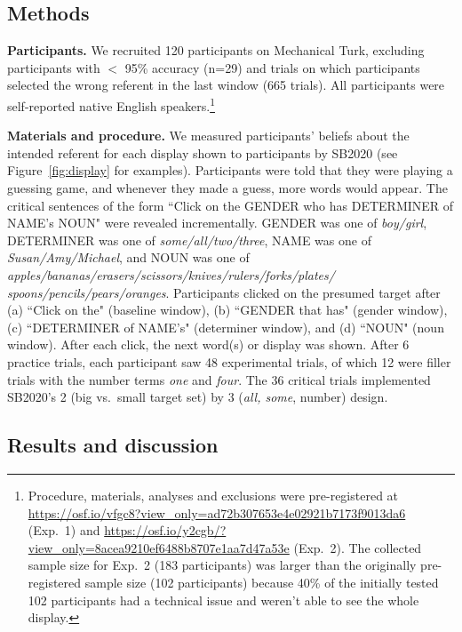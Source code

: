\documentclass[10pt,letterpaper]{article}
\newcommand{\figref}[1]{Figure~\ref{#1}}
\begin{document}
\subsection{Methods}

\textbf{Participants.} We recruited 120 participants on Mechanical Turk, excluding participants with $<$ 95\% accuracy (n=29) and trials on which participants selected the wrong referent in the last window (665 trials). All participants were self-reported native English speakers.\footnote{Procedure, materials, analyses and exclusions were pre-registered at \href{https://osf.io/vfgc8?view_only=ad72b307653e4e02921b7173f9013da6}{\url{https://osf.io/vfgc8?view_only=ad72b307653e4e02921b7173f9013da6}} (Exp.~1) and \href{https://osf.io/y2cgb/?view_only=8acea9210ef6488b8707e1aa7d47a53e}{\url{https://osf.io/y2cgb/?view_only=8acea9210ef6488b8707e1aa7d47a53e}} (Exp.~2). The collected sample size for Exp.~2 (183 participants) was larger than the originally pre-registered sample size (102 participants) because 40\% of the initially tested 102 participants had a technical issue and weren't able to see the whole display.}

\textbf{Materials and procedure.} We measured participants' beliefs about the intended referent for each display shown to participants by SB2020 (see \figref{fig:display} for examples). Participants were told that they were playing a guessing game, and whenever they made a guess, more words would appear. The critical sentences of the form ``Click on the GENDER who has DETERMINER  of NAME's NOUN" were revealed incrementally. GENDER was one of \emph{boy/girl}, DETERMINER was one of \emph{some/all/two/three}, NAME was one of \emph{Susan/Amy/Michael}, and NOUN was one of \emph{apples/bananas/erasers/scissors/knives/rulers/forks/plates/
spoons/pencils/pears/oranges}.  Participants clicked on the presumed target after (a) ``Click on the" (baseline window), (b) ``GENDER that has" (gender window), (c) ``DETERMINER of NAME's" (determiner window), and (d) ``NOUN" (noun window). After each click, the next word(s) or display was shown. After 6 practice trials, each participant saw 48 experimental trials, of which 12 were filler trials with the number terms \emph{one} and \emph{four}. The 36 critical trials implemented SB2020's 2 (big vs.~small target set) by 3 (\emph{all, some}, number) design. 


\subsection{Results and discussion}
\end{document}

